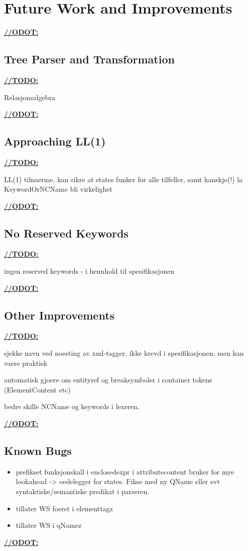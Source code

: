 \chapter{Future Work and Improvements}
\label{sect:summary:future_work}




\underline{\textbf{\LARGE //ODOT:}}

\section{Tree Parser and Transformation}
\underline{\textbf{\LARGE //TODO:}}

Relasjonsalgebra

\underline{\textbf{\LARGE //ODOT:}}

\section{Approaching LL(1)}

\underline{\textbf{\LARGE //TODO:}}

LL(1) tilnaerme, kan sikre at states funker for alle tilfeller, samt kanskje(!) la KeywordOrNCName bli virkelighet

\underline{\textbf{\LARGE //ODOT:}}

\section{No Reserved Keywords}

\underline{\textbf{\LARGE //TODO:}}

ingen reserved keywords - i hennhold til spesifikasjonen

\underline{\textbf{\LARGE //ODOT:}}

\section{Other Improvements}

\underline{\textbf{\LARGE //TODO:}}

sjekke navn ved noesting av xml-tagger, ikke krevd i spesifikasjonen, men kan vaere praktisk

automatisk gjoere om entityref og breaksymboler i container tokens (ElementContent etc)

bedre skille NCName og keywords i lexeren.

\underline{\textbf{\LARGE //ODOT:}}

\section{Known Bugs}
\label{sect:future:knownBugs}
\begin{itemize}
		\item prefikset funksjonskall i enclosedexpr i attributecontent bruker for mye lookahead -> oedelegger for states. Fikse med ny QName eller evt syntaktiske/semantiske predikat i parseren.
		\item tillater WS foerst i elementtagz
		\item tillater WS i qNamez
	\end{itemize}

\underline{\textbf{\LARGE //ODOT:}}
